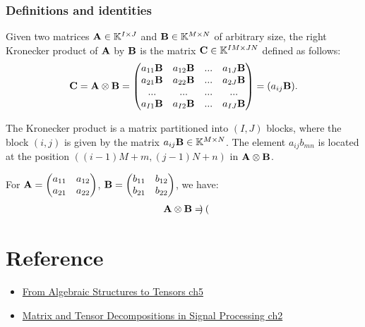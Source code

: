 \subsubsection{Definitions and identities}
\begin{definition}{}{}
    Given two matrices $\bold{A}\in\mathbb{K}^{I\times J}$ and $\bold{B}\in \mathbb{K}^{M\times N}$
    of arbitrary size, the right Kronecker product of $\bold{A}$ by $\bold{B}$ is the matrix $\bold{C}\in \mathbb{K}^{IM\times JN}$
    defined as follows:
    \begin{align*}
        \bold{C}=\bold{A}\otimes \bold{B}=\begin{pmatrix}
            a_{11}\bold{B} & a_{12}\bold{B} & ...& a_{1J}\bold{B}\\
            a_{21} \bold{B} & a_{22}\bold{B} & ... & a_{2J}\bold{B}\\
            ...&...&...&...\\
            a_{I1}\bold{B}&a_{I2}\bold{B}&...&a_{IJ}\bold{B}
        \end{pmatrix}=(a_{ij}\bold{B}).
    \end{align*}
\end{definition}
\begin{remark}
    The Kronecker product is a matrix partitioned into $(I,J)$ blocks, where the block $(i,j)$ is given by the matrix $a_{ij}\bold{B}\in \mathbb{K}^{M\times N}$.
    The element $a_{ij}b_{mn}$ is located at the position $((i-1)M+m,(j-1)N+n)$ in $\bold{A}\otimes \bold{B}$.
\end{remark}

\begin{example}{}{}
    For $\bold{A}=\begin{pmatrix}
        a_{11}&a_{12}\\
        a_{21}&a_{22}
    \end{pmatrix}$,
    $\bold{B}=\begin{pmatrix}
        b_{11}&b_{12}\\
        b_{21}&b_{22}
    \end{pmatrix}$, we have:
    \begin{align*}
        \bold{A}\otimes \bold{B}=\begin{pmatrix}
            
        \end{pmatrix}
    \end{align*}
\end{example}


\section{Reference}
\begin{itemize}
    \item \href{}{From Algebraic Structures to Tensors ch5}
    \item \href{}{Matrix and Tensor Decompositions in Signal Processing ch2}
\end{itemize}